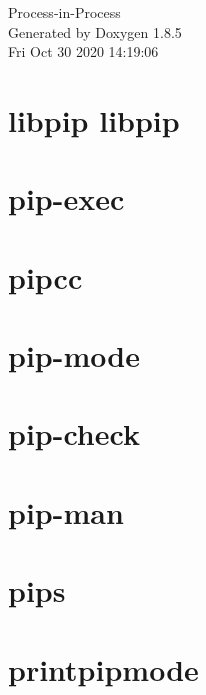 \documentclass[twoside]{book}
\newcommand{\clearemptydoublepage}{%
  \newpage{\pagestyle{empty}\cleardoublepage}%
}
\begin{document}
\hypersetup{pageanchor=false}
\begin{titlepage}
\vspace*{7cm}
\begin{center}%
{\Large Process-\/in-\/\-Process }\\
\vspace*{1cm}
{\large Generated by Doxygen 1.8.5}\\
\vspace*{0.5cm}
{\small Fri Oct 30 2020 14:19:06}\\
\end{center}
\end{titlepage}
\clearemptydoublepage
\tableofcontents
\clearemptydoublepage
{}
\hypersetup{pageanchor=true}

\chapter{libpip libpip}
\label{index}\hypertarget{index}{}
\chapter{pip-\/exec}
\label{pip-exec}
\hypertarget{pip-exec}{}

\chapter{pipcc}
\label{pipcc}
\hypertarget{pipcc}{}

\chapter{pip-\/mode}
\label{pip-mode}
\hypertarget{pip-mode}{}

\chapter{pip-\/check}
\label{pip-check}
\hypertarget{pip-check}{}

\chapter{pip-\/man}
\label{pip-man}
\hypertarget{pip-man}{}

\chapter{pips}
\label{pips}
\hypertarget{pips}{}

\chapter{printpipmode}
\label{printpipmode}
\hypertarget{printpipmode}{}

\end{document}
